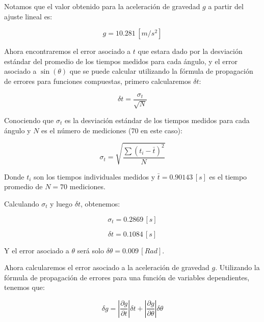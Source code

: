\documentclass{article}
\begin{document}
\begin{multicols}{2}
    Notamos que el valor obtenido para la aceleración de gravedad $g$ a partir del ajuste lineal es:

    \begin{equation}
        g = 10.281 \, [m/s^2]
    \end{equation}

    Ahora encontraremos el error asociado a $t$ que estara dado por la desviación estándar del promedio de los tiempos medidos
    para cada ángulo, y el error asociado a $\sin(\theta)$ que se puede calcular utilizando la fórmula de propagación de errores
    para funciones compuestas, primero calcularemos $\delta t$:

    \begin{equation}
        \delta t = \dfrac{\sigma_t}{\sqrt{N}}
    \end{equation}

    Conociendo que $\sigma_t$ es la desviación estándar de los tiempos medidos para cada ángulo y $N$ es el número de mediciones 
    (70 en este caso):

    \begin{equation}
        \sigma_t = \sqrt{\dfrac{\sum (t_i - \bar{t})^2}{N}}
    \end{equation}

    Donde $t_i$ son los tiempos individuales medidos y $\bar{t} = 0.90143 \, [s]$ es el tiempo promedio de $N = 70$ mediciones.

    Calculando $\sigma_t$ y luego $\delta t$, obtenemos:
    
    \begin{equation}
        \sigma_t = 0.2869 \, [s]
    \end{equation}

    \begin{equation}
        \delta t = 0.1084 \, [s]
    \end{equation}

    Y el error asociado a $\theta$ será solo $\delta \theta = 0.009 \, [Rad]$.

    Ahora calcularemos el error asociado a la aceleración de gravedad $g$. Utilizando la fórmula de propagación de errores
    para una función de variables dependientes, tenemos que:

    \begin{equation}
        \delta g = \left|\dfrac{\partial g}{\partial t}\right| \delta t + \left|\dfrac{\partial g}{\partial \theta}\right| \delta \theta
    \end{equation}


\end{multicols}
\end{document}
